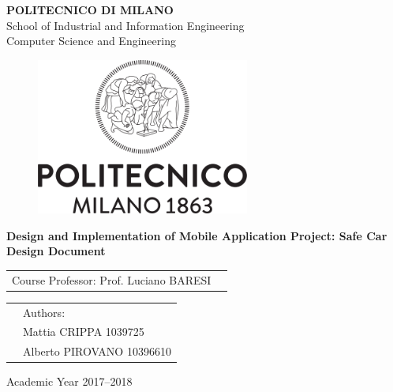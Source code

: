 \documentclass[a4paper, 12pt]{report}
\begin{document}
\begin{titlepage}

\begin{center}
\Large
\textbf{POLITECNICO DI MILANO} \\
\Large
School of Industrial and Information Engineering \\
Computer Science and Engineering
\end{center}

\addvspace{0.8cm}
\begin{figure}[h]
\begin{center}
\includegraphics[width=7cm]{cpt/img/polimi.png}
\end{center}
\end{figure}

\addvspace{0.1cm}
\begin{center}
\LARGE

\textbf{Design and Implementation of Mobile Application Project: Safe Car \\
Design Document}

\end{center}

\addvspace{0.5cm}
\Large
\begin{center}
\begin{tabular}{p{}p{}}
Course Professor: Prof. Luciano BARESI \\
\end{tabular}
\end{center}

\addvspace{0.6cm}
\Large
\begin{center}
\begin{tabular}{p{}p{}}
& Authors: \\
& Mattia	CRIPPA		1039725\\
& Alberto PIROVANO	10396610
\end{tabular}
\end{center}

\vfill
\Large
\begin{center}
Academic Year 2017--2018
\end{center}
\end{titlepage}
\end{document}
